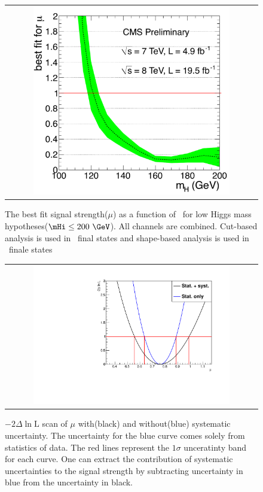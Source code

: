 %
\begin{figure}[htp] 
\centering 
\begin{tabular}{c} 
\includegraphics[width=0.8\textwidth]{figures/mlf7p8TeV_zoomed.pdf}
\end{tabular} 
\caption{The best fit signal strength($\mu$) as a function of \mHi\ for low Higgs 
mass hypotheses($\mHi\le200~\GeV$).
All channels are combined. 
Cut-based analysis is used in \SF\ final states 
and shape-based analysis is used in \DF\ finale states} 
\label{fig:mu_mH} 
\end{figure} 

%
\begin{figure}[htp] 
\centering 
\begin{tabular}{c} 
\includegraphics[width=0.8\textwidth]{figures/MuDeltaNLL.pdf}
\end{tabular} 
\caption{ $- 2\Delta\ln \textrm{L}$ scan of $\mu$ with(black) 
and without(blue) systematic uncertainty.
The uncertainty for the blue curve comes solely from statistics of data.
The red lines represent the $1\sigma$ unceratinty band for each curve. 
One can extract the contribution of systematic uncertainties to the signal strength
by subtracting uncertainty in blue from the uncertainty in black.} 
\label{fig:mu_scan} 
\end{figure} 

